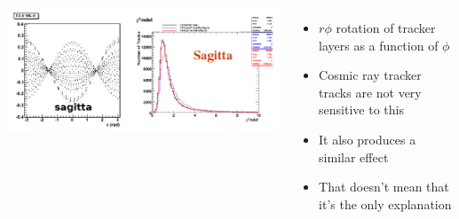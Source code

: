 \documentclass[compress]{beamer}
\begin{document}
\begin{frame}
\begin{columns}
\includegraphics[width=\linewidth]{sagitta.png}

\begin{itemize}
\item $r\phi$ rotation of tracker layers as a function of $\phi$

\item Cosmic ray tracker tracks are not very sensitive to this

\item It also produces a similar effect

\item That doesn't mean that it's the only explanation
\end{itemize}
\end{columns}
\end{frame}
\end{document}
